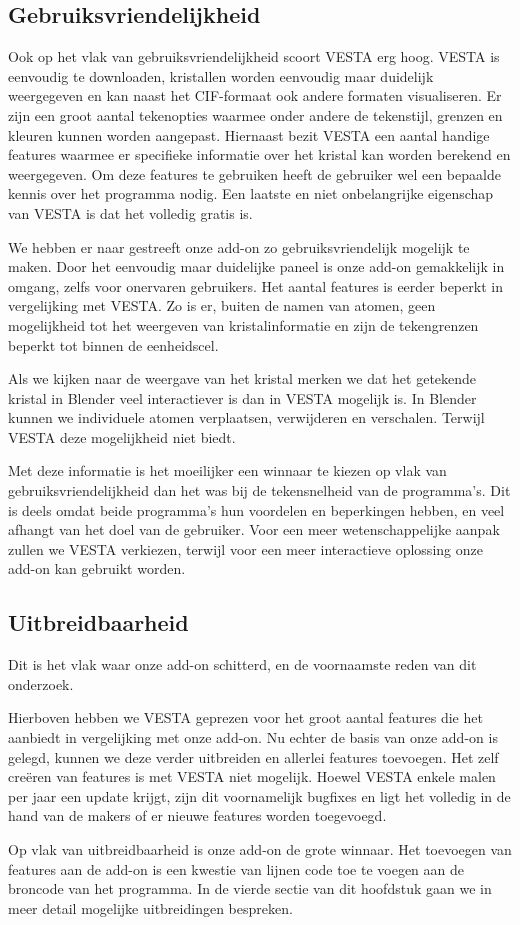\subsection{Gebruiksvriendelijkheid}	 
Ook op het vlak van gebruiksvriendelijkheid scoort VESTA erg hoog. VESTA is eenvoudig te downloaden, kristallen worden eenvoudig maar duidelijk weergegeven en kan naast het CIF-formaat ook andere formaten visualiseren. Er zijn een groot aantal tekenopties waarmee onder andere de tekenstijl, grenzen en kleuren kunnen worden aangepast. Hiernaast bezit VESTA een aantal handige features waarmee er specifieke informatie over het kristal kan worden berekend en weergegeven. Om deze features te gebruiken heeft de gebruiker wel een bepaalde kennis over het programma nodig. Een laatste en niet  onbelangrijke eigenschap van VESTA is dat het volledig gratis is.
\par
We hebben er naar gestreeft onze add-on zo gebruiksvriendelijk mogelijk te maken. Door het eenvoudig maar duidelijke paneel is onze add-on gemakkelijk in omgang, zelfs voor onervaren gebruikers. Het aantal features is eerder beperkt in vergelijking met VESTA. Zo is er, buiten de namen van atomen, geen mogelijkheid tot het weergeven van kristalinformatie en zijn de tekengrenzen beperkt tot binnen de eenheidscel. 
\par
Als we kijken naar de weergave van het kristal merken we dat het getekende kristal in Blender veel interactiever is dan in VESTA mogelijk is. In Blender kunnen we individuele atomen verplaatsen, verwijderen en verschalen. Terwijl VESTA deze mogelijkheid niet biedt.
\par
Met deze informatie is het moeilijker een winnaar te kiezen op vlak van gebruiksvriendelijkheid dan het was bij de tekensnelheid van de programma's. Dit is deels omdat beide programma's hun voordelen en beperkingen hebben, en veel afhangt van het doel van de gebruiker. Voor een meer wetenschappelijke aanpak zullen we VESTA verkiezen, terwijl voor een meer interactieve oplossing onze add-on kan gebruikt worden.

\subsection{Uitbreidbaarheid}
Dit is het vlak waar onze add-on schitterd, en de voornaamste reden van dit onderzoek. 
\par
Hierboven hebben we VESTA geprezen voor het groot aantal features die het aanbiedt in vergelijking met onze add-on. Nu echter de basis van onze add-on is gelegd, kunnen we deze verder uitbreiden en allerlei features toevoegen. Het zelf creëren van features is met VESTA niet mogelijk. Hoewel VESTA enkele malen per jaar een update krijgt, zijn dit voornamelijk bugfixes en ligt het volledig in de hand van de makers of er nieuwe features worden toegevoegd.   
\par
Op vlak van uitbreidbaarheid is onze add-on de grote winnaar. Het toevoegen van features aan de add-on is een kwestie van lijnen code toe te voegen aan de broncode van het programma. In de vierde sectie van dit hoofdstuk gaan we in meer detail mogelijke uitbreidingen bespreken. 


